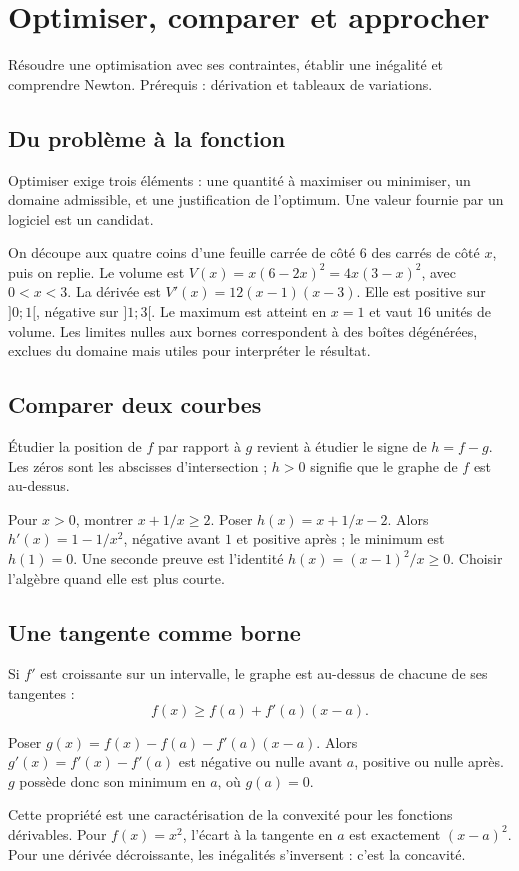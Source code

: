 \documentclass[../cours_1re.tex]{subfiles}
\begin{document}
\setcounter{chapter}{10}
\chapter{Optimiser, comparer et approcher}
\label{ch:11}
\begin{objectif}
Résoudre une optimisation avec ses contraintes, établir une inégalité et comprendre Newton. Prérequis : dérivation et tableaux de variations.
\end{objectif}
\section{Du problème à la fonction}
Optimiser exige trois éléments : une quantité à maximiser ou minimiser, un domaine admissible, et une justification de l'optimum. Une valeur fournie par un logiciel est un candidat.
\begin{exemple}
On découpe aux quatre coins d'une feuille carrée de côté $6$ des carrés de côté $x$, puis on replie. Le volume est
$V(x)=x(6-2x)^2=4x(3-x)^2$, avec $0<x<3$.
La dérivée est $V'(x)=12(x-1)(x-3)$. Elle est positive sur $]0;1[$, négative sur $]1;3[$.
Le maximum est atteint en $x=1$ et vaut $16$ unités de volume. Les limites nulles aux bornes correspondent à des boîtes dégénérées, exclues du domaine mais utiles pour interpréter le résultat.
\end{exemple}
\section{Comparer deux courbes}
Étudier la position de $f$ par rapport à $g$ revient à étudier le signe de $h=f-g$. Les zéros sont les abscisses d'intersection ; $h>0$ signifie que le graphe de $f$ est au-dessus.
\begin{exemple}
Pour $x>0$, montrer $x+1/x\ge2$. Poser $h(x)=x+1/x-2$.
Alors $h'(x)=1-1/x^2$, négative avant $1$ et positive après ; le minimum est $h(1)=0$.
Une seconde preuve est l'identité $h(x)=(x-1)^2/x\ge0$. Choisir l'algèbre quand elle est plus courte.
\end{exemple}
\section{Une tangente comme borne}
\approfondissement Si $f'$ est croissante sur un intervalle, le graphe est au-dessus de chacune de ses tangentes :
\[
f(x)\ge f(a)+f'(a)(x-a).
\]
\begin{demonstration}
Poser $g(x)=f(x)-f(a)-f'(a)(x-a)$. Alors $g'(x)=f'(x)-f'(a)$ est négative ou nulle avant $a$, positive ou nulle après. $g$ possède donc son minimum en $a$, où $g(a)=0$.
\end{demonstration}
Cette propriété est une caractérisation de la convexité pour les fonctions dérivables. Pour $f(x)=x^2$, l'écart à la tangente en $a$ est exactement $(x-a)^2$. Pour une dérivée décroissante, les inégalités s'inversent : c'est la concavité.
\end{document}
